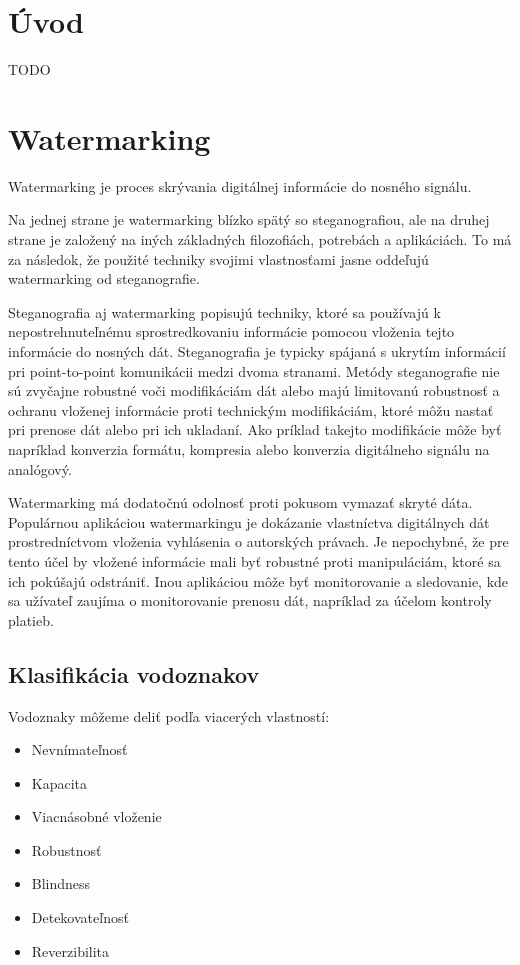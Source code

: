 \chapter{Úvod}
TODO

\chapter{Watermarking}
Watermarking je proces skrývania digitálnej informácie do nosného signálu.

Na jednej strane je watermarking blízko spätý so steganografiou, ale na druhej strane je založený na iných základných filozofiách, potrebách a aplikáciách. To má za následok, že použité techniky svojimi vlastnosťami jasne oddeľujú watermarking od steganografie.

Steganografia aj watermarking popisujú techniky, ktoré sa používajú k nepostrehnuteľnému sprostredkovaniu informácie pomocou vloženia tejto informácie do nosných dát. Steganografia je typicky spájaná s ukrytím informácií pri point-to-point komunikácii medzi dvoma stranami. Metódy steganografie nie sú zvyčajne robustné voči modifikáciám dát alebo majú limitovanú robustnosť a ochranu vloženej informácie proti technickým modifikáciám, ktoré môžu nastať pri prenose dát alebo pri ich ukladaní. Ako príklad takejto modifikácie môže byť napríklad konverzia formátu, kompresia alebo konverzia digitálneho signálu na analógový.

Watermarking má dodatočnú odolnosť proti pokusom vymazať skryté dáta. Populárnou aplikáciou watermarkingu je dokázanie vlastníctva digitálnych dát prostredníctvom vloženia vyhlásenia o autorských právach. Je nepochybné, že pre tento účel by vložené informácie mali byť  robustné proti manipuláciám, ktoré sa ich pokúšajú odstrániť. Inou aplikáciou môže byť monitorovanie a sledovanie, kde sa užívateľ zaujíma o monitorovanie prenosu dát, napríklad za účelom kontroly platieb. \cite{Katzenbeisser}

\section{Klasifikácia vodoznakov}
Vodoznaky môžeme deliť podľa viacerých vlastností:
\begin{itemize}
\item Nevnímateľnosť
\item Kapacita
\item Viacnásobné vloženie
\item Robustnosť
\item Blindness
\item Detekovateľnosť
\item Reverzibilita
\end{itemize}

